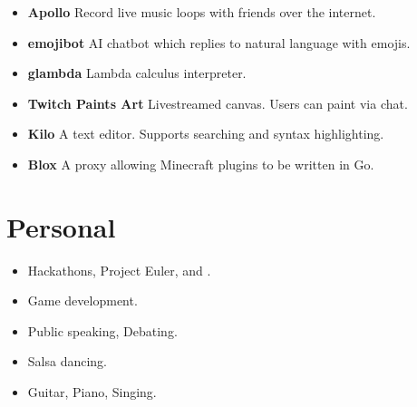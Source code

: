 \documentclass{jcgcv}
\begin{document}
\begin{column}
\begin{itemize}
  \item \textbf{Apollo} Record live music loops with friends over the internet.
  \item \textbf{emojibot} AI chatbot which replies to natural language with emojis.
  \item \textbf{glambda} Lambda calculus interpreter.
  \item \textbf{Twitch Paints Art} Livestreamed canvas. Users can paint via chat.
  \item \textbf{Kilo} A text editor. Supports searching and syntax highlighting.
  \item \textbf{Blox} A proxy allowing Minecraft plugins to be written in Go.
\end{itemize}

\section{Personal}

\begin{itemize}
  \item Hackathons, Project Euler, and .
  \item Game development.
  \item Public speaking, Debating.
  \item Salsa dancing.
  \item Guitar, Piano, Singing.
\end{itemize}

\end{column}
\end{document}
